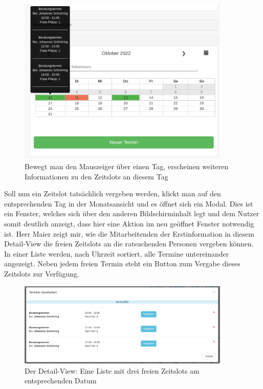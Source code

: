 \documentclass[12pt]{article}
\newcommand{\ipName}{Herr Maier }
\begin{document}
\begin{figure}[h]
    \caption{Bewegt man den Mauszeiger über einen Tag, erscheinen weiteren Informationen zu den Zeitslots an diesem Tag}
    \centering
    \includegraphics[width=0.9\textwidth]{screen_old_hover.png}
\end{figure}

Soll nun ein Zeitslot tatsächlich vergeben werden, klickt man auf den
entsprechenden Tag in der Monatsansicht und es öffnet sich ein Modal. Dies ist
ein Fenster, welches sich über den anderen Bildschirminhalt legt und dem Nutzer
somit deutlich anzeigt, dass hier eine Aktion im neu geöffnet Fenster notwendig
ist. \ipName zeigt mir, wie die Mitarbeitenden der Erstinformation in diesem
Detail-View die freien Zeitslots an die ratsuchenden Personen vergeben können.
In einer Liste werden, nach Uhrzeit sortiert, alle Termine untereinander
angezeigt. Neben jedem freien Termin steht ein Button zum Vergabe dieses
Zeitslots zur Verfügung.

\begin{figure}[h]
    \caption{Der Detail-View: Eine Liste mit drei freien Zeitslots am entsprechenden Datum}
    \centering
    \includegraphics[width=0.9\textwidth]{screen_old_daylist.png}
\end{figure}
\end{document}
